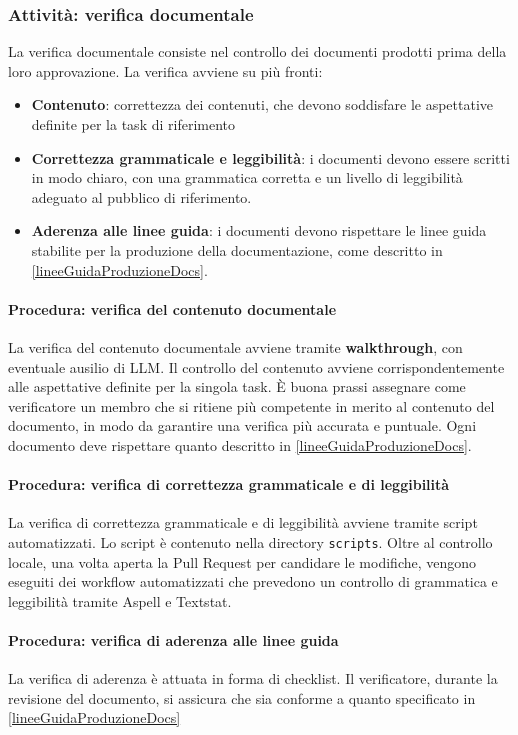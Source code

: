 \documentclass[a4paper,12pt]{article}
\begin{document}
\subsubsection{Attività: verifica documentale}
La verifica documentale consiste nel controllo dei documenti prodotti prima
della loro approvazione. La verifica avviene su più fronti:
\begin{itemize}
    \item \textbf{Contenuto}: correttezza dei contenuti, che devono soddisfare le aspettative definite per la task di riferimento
    \item \textbf{Correttezza grammaticale e leggibilità}: i documenti devono essere scritti in modo chiaro, con una grammatica corretta e un livello di leggibilità adeguato al pubblico di riferimento.
    \item \textbf{Aderenza alle linee guida}: i documenti devono rispettare le linee guida stabilite per la produzione della documentazione, come descritto in \ref{lineeGuidaProduzioneDocs}.
\end{itemize}

\paragraph{Procedura: verifica del contenuto documentale}
La verifica del contenuto documentale avviene tramite \textbf{walkthrough}, con
eventuale ausilio di LLM. Il controllo del contenuto avviene
corrispondentemente alle aspettative definite per la singola task. È buona
prassi assegnare come verificatore un membro che si ritiene più competente in
merito al contenuto del documento, in modo da garantire una verifica più
accurata e puntuale. Ogni documento deve rispettare quanto descritto in
\ref{lineeGuidaProduzioneDocs}.

\paragraph{Procedura: verifica di correttezza grammaticale e di leggibilità}
La verifica di correttezza grammaticale e di leggibilità avviene tramite script
automatizzati. Lo script è contenuto nella directory \texttt{scripts}. Oltre al
controllo locale, una volta aperta la Pull Request per candidare le modifiche,
vengono eseguiti dei workflow automatizzati che prevedono un controllo di
grammatica e leggibilità tramite Aspell e Textstat.\\

\paragraph{Procedura: verifica di aderenza alle linee guida}
La verifica di aderenza è attuata in forma di checklist. Il verificatore, durante la revisione del documento, si assicura che sia conforme a quanto specificato in \ref{lineeGuidaProduzioneDocs}
\end{document}
